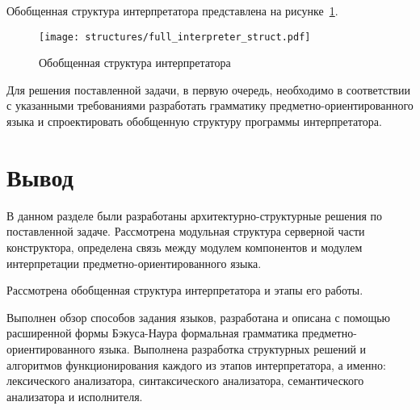 Обобщенная структура интерпретатора представлена на рисунке~\ref{f:full_interpreter_struct}.

\begin{figure}[ht]
	\centering
	\vspace{\toppaddingoffigure}
	\texttt{[image: structures/full\_interpreter\_struct.pdf]}
	\caption{Обобщенная структура интерпретатора}
	\label{f:full_interpreter_struct}
\end{figure}

Для решения поставленной задачи, в первую очередь, необходимо в соответствии с указанными требованиями
разработать грамматику предметно-ориентированного языка и спроектировать обобщенную структуру программы интерпретатора.







\section*{Вывод}

В данном разделе были разработаны архитектурно-структурные решения по поставленной задаче.
Рассмотрена модульная структура серверной части конструктора,
определена связь между модулем компонентов и модулем интерпретации предметно-ориентированного языка.

Рассмотрена обобщенная структура интерпретатора и этапы его работы.

Выполнен обзор способов задания языков, разработана и описана с помощью расширенной формы Бэкуса-Наура формальная грамматика предметно-ориентированного языка.
Выполнена разработка структурных решений и алгоритмов функционирования каждого из этапов интерпретатора, а именно:
лексического анализатора, синтаксического анализатора, семантического анализатора и исполнителя.